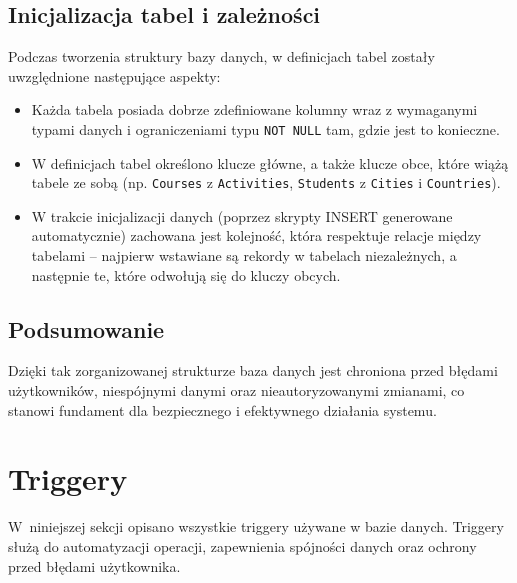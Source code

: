 \documentclass[12pt]{article}
\begin{document}
\subsection{Inicjalizacja tabel i zależności}
Podczas tworzenia struktury bazy danych, w definicjach tabel zostały uwzględnione następujące aspekty:
\begin{itemize}
    \item Każda tabela posiada dobrze zdefiniowane kolumny wraz z wymaganymi typami danych i ograniczeniami typu \texttt{NOT NULL} tam, gdzie jest to konieczne.
    \item W definicjach tabel określono klucze główne, a także klucze obce, które wiążą tabele ze sobą (np. \texttt{Courses} z \texttt{Activities}, \texttt{Students} z \texttt{Cities} i \texttt{Countries}).
    \item W trakcie inicjalizacji danych (poprzez skrypty INSERT generowane automatycznie) zachowana jest kolejność, która respektuje relacje między tabelami – najpierw wstawiane są rekordy w tabelach niezależnych, a następnie te, które odwołują się do kluczy obcych.
\end{itemize}

\subsection{Podsumowanie}
Dzięki tak zorganizowanej strukturze baza danych jest chroniona przed błędami użytkowników, niespójnymi danymi oraz nieautoryzowanymi zmianami, co stanowi fundament dla bezpiecznego i efektywnego działania systemu.



\newpage
\section{Triggery}
\label{sec:triggery}

W~niniejszej sekcji opisano wszystkie triggery używane w bazie danych. Triggery służą do 
automatyzacji operacji, zapewnienia spójności danych oraz ochrony przed błędami użytkownika.
\end{document}
